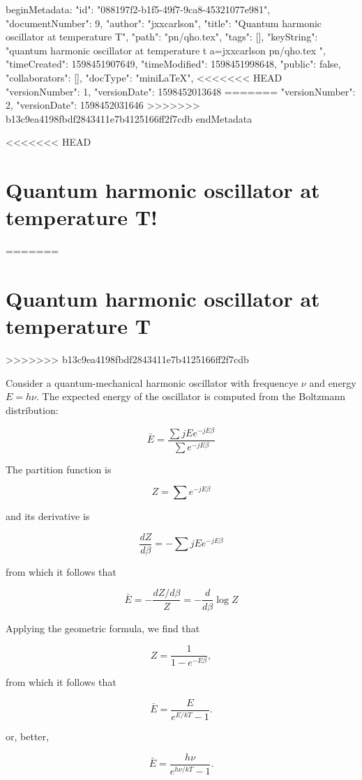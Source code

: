 beginMetadata:
{
    "id": "088197f2-b1f5-49f7-9ca8-45321077e981",
    "documentNumber": 9,
    "author": "jxxcarlson",
    "title": "Quantum harmonic oscillator at temperature T",
    "path": "pn/qho.tex",
    "tags": [],
    "keyString": "quantum harmonic oscillator at temperature t a=jxxcarlson pn/qho.tex ",
    "timeCreated": 1598451907649,
    "timeModified": 1598451998648,
    "public": false,
    "collaborators": [],
    "docType": "miniLaTeX",
<<<<<<< HEAD
    "versionNumber": 1,
    "versionDate": 1598452013648
=======
    "versionNumber": 2,
    "versionDate": 1598452031646
>>>>>>> b13c9ea4198fbdf2843411e7b4125166ff2f7cdb
}
endMetadata

<<<<<<< HEAD
\section{Quantum harmonic oscillator at temperature T!}
=======
\section{Quantum harmonic oscillator at temperature T}
>>>>>>> b13c9ea4198fbdf2843411e7b4125166ff2f7cdb

Consider a quantum-mechanical harmonic oscillator with frequencye $\nu$ and energy $E = h\nu$.  The expected energy of the oscillator is computed from the Boltzmann distribution:

\begin{equation}
\bar{E} = \frac{\sum jE e^{-jE\beta}}{\sum e^{-jE\beta}}
\end{equation}

The partition function is

\begin{equation}
Z = \sum e^{-jE\beta}
\end{equation}

and its derivative is


\begin{equation}
\frac{dZ}{d\beta} =  - \sum jE e^{-jE\beta}
\end{equation}

from which it follows that

\begin{equation}
\bar{E} = - \frac{dZ/d\beta}{Z} = - \frac{d}{d\beta} \log Z
\end{equation}

Applying the geometric formula, we find that

\begin{equation}
Z = \frac{1}{1 - e^{-E\beta}},
\end{equation}

from which it follows that

\begin{equation}
\bar{E} = \frac{E}{e^{E/kT} - 1}.
\end{equation}


or, better,


\begin{equation}
\bar{E} = \frac{h\nu}{e^{h\nu/kT} - 1}.
\end{equation}
